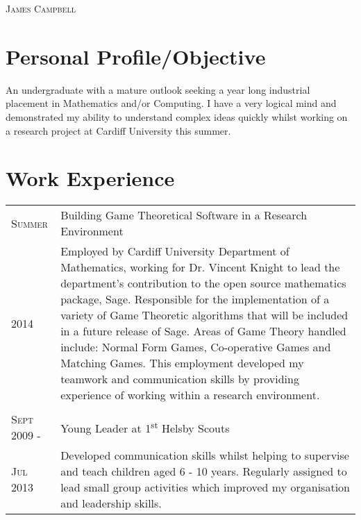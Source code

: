 \documentclass[a4paper, 11pt]{article}
\begin{document}
\pagestyle{empty} %
\begin{multicols}{2}

\raggedright{\textsc{\Huge{James Campbell}}}\\
\columnbreak
{}

\end{multicols}
\section{Personal Profile/Objective}
An undergraduate with a mature outlook seeking a year long industrial placement in Mathematics and/or Computing. I have a very logical mind and demonstrated my ability to understand complex ideas quickly whilst working on a research project at Cardiff University this summer.

\section{Work Experience}
\begin{tabularx}{\textwidth}{lX}

\textsc{Summer} & Building Game Theoretical Software in a Research Environment \\
\textsc{2014}& \footnotesize{Employed by Cardiff University Department of Mathematics, working for Dr. Vincent Knight to lead the department's contribution to the open source mathematics package, Sage. Responsible for the implementation of a variety of Game Theoretic algorithms that will be included in a future release of Sage. Areas of Game Theory handled include: Normal Form Games, Co-operative Games and Matching Games. This employment developed my teamwork and communication skills by providing experience of working within a research environment.}\\
\\
\textsc{Sept 2009 -} & Young Leader at 1\textsuperscript{st} Helsby Scouts\\
\textsc{Jul 2013}& \footnotesize{Developed communication skills whilst helping to supervise and teach children aged 6 - 10 years. Regularly assigned to lead small group activities which improved my organisation and leadership skills.}\\

\end{tabularx}
\end{document}
